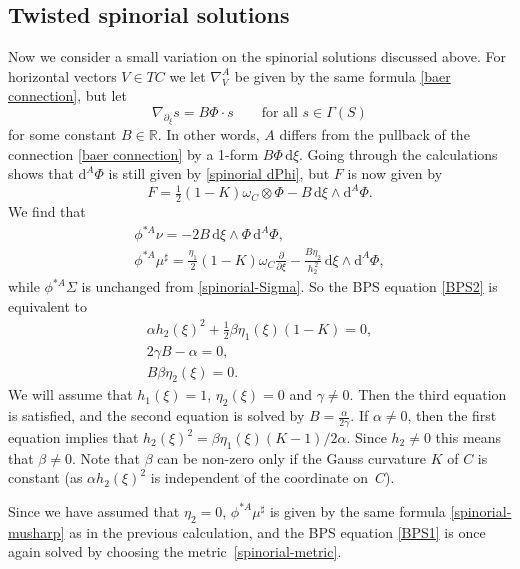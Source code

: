 \documentclass[pdftex]{sigma}
\newcommand{\R}{{\mathbb{R}}}
\newcommand{\1}{{\mathbb{1}}}
\def \d{\mathrm{d}}
\numberwithin{equation}{section}
\begin{document}
\subsection{Twisted spinorial solutions}
\label{sec:twisted}
Now we consider a small variation on the spinorial solutions discussed above. For horizontal vectors $V\in TC$ we let $\nabla^A_V$ be given by the same formula \eqref{baer connection}, but let
\begin{equation*}
\nabla_{\partial_\xi}s = B\Phi\cdot s\qquad\text{for all }s\in\Gamma(S)
\end{equation*}
for some constant $B\in\R$. In other words, $A$ differs from the pullback of the connection \eqref{baer connection} by a 1-form $B\Phi\,\d\xi$. Going through the calculations shows that $\d^A\Phi$ is still given by \eqref{spinorial dPhi}, but $F$ is now given by
\begin{equation*}
F = \tfrac{1}{2}(1-K)\omega_C\otimes\Phi-B\,\d\xi\wedge\d^A\Phi.
\end{equation*}
We find that
\begin{gather*}
\phi^{\ast A}\nu = -2B\,\d\xi\wedge\Phi\,\d^A\Phi, \\
\phi^{\ast A}\mu^\sharp = \frac{\eta_1}{2}(1-K)\omega_C\frac{\partial}{\partial\xi} - \frac{B\eta_2}{h_2^{\,2}}\,\d\xi\wedge\d^A\Phi,
\end{gather*}
while $\phi^{\ast A}\Sigma$ is unchanged from \eqref{spinorial-Sigma}. So the BPS equation \eqref{BPS2} is equivalent to
\begin{gather*}
\alpha h_2(\xi)^2 + \tfrac{1}{2}\beta\eta_1(\xi)(1-K) =0,\\
2\gamma B-\alpha =0, \\
B\beta\eta_2(\xi) =0.
\end{gather*}
We will assume that $h_1(\xi)=1$, $\eta_2(\xi)=0$ and $\gamma\neq0$. Then the third equation is satisfied, and the second equation is solved by $B=\frac{\alpha}{2\gamma}$. If $\alpha\neq0$, then the first equation implies that $h_2(\xi)^2=\beta\eta_1(\xi)(K-1)/2\alpha$. Since $h_2\neq0$ this means that $\beta\neq0$. Note that $\beta$ can be non-zero only if the Gauss curvature $K$ of $C$ is constant (as $\alpha h_2(\xi)^2$ is independent of the coordinate on~$C$).

Since we have assumed that $\eta_2=0$, $\phi^{\ast A}\mu^\sharp$ is given by the same formula \eqref{spinorial-musharp} as in the previous calculation, and the BPS equation \eqref{BPS1} is once again solved by choosing the metric~\eqref{spinorial-metric}.
\end{document}
